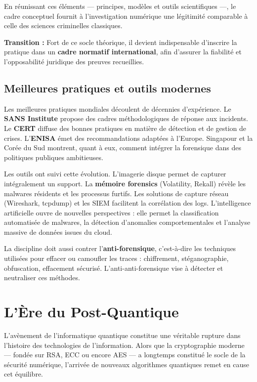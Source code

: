 \documentclass[memoire, 12pt]{report}
\begin{document}
En réunissant ces éléments — principes, modèles et outils scientifiques —, 
le cadre conceptuel fournit à l’investigation numérique une légitimité 
comparable à celle des sciences criminelles classiques.  

\textbf{Transition :} Fort de ce socle théorique, il devient indispensable 
d’inscrire la pratique dans un \textbf{cadre normatif international}, 
afin d’assurer la fiabilité et l’opposabilité juridique des preuves recueillies.  
  

\subsection*{Meilleures pratiques et outils modernes}
Les meilleures pratiques mondiales découlent de décennies d’expérience.  
Le \textbf{SANS Institute} propose des cadres méthodologiques de réponse aux incidents.  
Le \textbf{CERT} diffuse des bonnes pratiques en matière de détection et de gestion de crises.  
L’\textbf{ENISA} émet des recommandations adaptées à l’Europe.  
Singapour et la Corée du Sud montrent, quant à eux, comment intégrer la forensique 
dans des politiques publiques ambitieuses.  

Les outils ont suivi cette évolution.  
L’imagerie disque permet de capturer intégralement un support.  
La \textbf{mémoire forensics} (Volatility, Rekall) révèle les malwares résidents et les processus furtifs.  
Les solutions de capture réseau (Wireshark, tcpdump) et les SIEM facilitent la corrélation des logs.  
L’intelligence artificielle ouvre de nouvelles perspectives : 
elle permet la classification automatisée de malwares, la détection d’anomalies comportementales 
et l’analyse massive de données issues du cloud.  

La discipline doit aussi contrer l’\textbf{anti-forensique}, 
c’est-à-dire les techniques utilisées pour effacer ou camoufler les traces : chiffrement, stéganographie, obfuscation, effacement sécurisé.  
L’anti-anti-forensique vise à détecter et neutraliser ces méthodes.  

\section*{L’Ère du Post-Quantique}

L’avènement de l’informatique quantique constitue une véritable rupture dans 
l’histoire des technologies de l’information. Alors que la cryptographie moderne 
— fondée sur RSA, ECC ou encore AES — a longtemps constitué le socle de la 
sécurité numérique, l’arrivée de nouveaux algorithmes quantiques remet en cause 
cet équilibre.  
\end{document}
